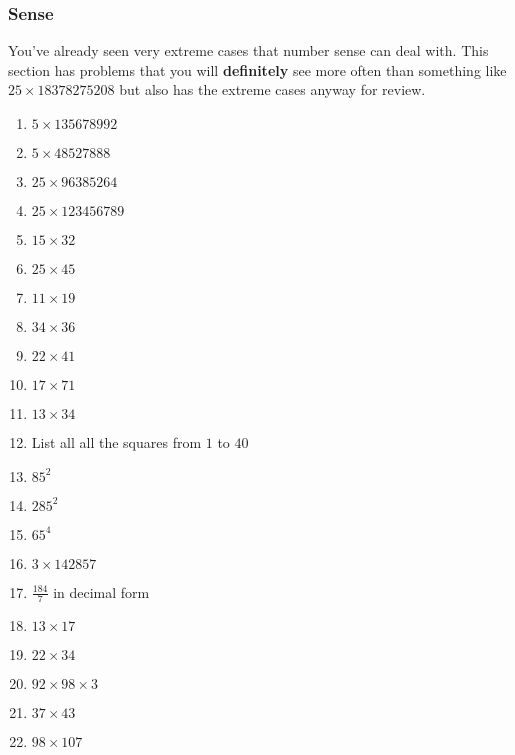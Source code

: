 		\subsubsection{Sense}
			You've already seen very extreme cases that number sense can deal with. This section has problems that you will \textbf{definitely} see more often than something like $25 \times 18378275208$ but also has the extreme cases anyway for review.
			\begin{enumerate}
				\item $5 \times 135678992$
				\item $5 \times 48527888$
				\item $25 \times 96385264$
				\item $25 \times 123456789$
				\item $15 \times 32$
				\item $25 \times 45$
				\item $11 \times 19$
				\item $34 \times 36$
				\item $22 \times 41$
				\item $17 \times 71$
				\item $13 \times 34$
				\item List all all the squares from $1$ to $40$
				\item $85^2$
				\item $285^2$
				\item $65^4$
				\item $3 \times 142857$
				\item $\frac{184}{7}$ in decimal form
				\item $13 \times 17$
				\item $22 \times 34$
				\item $92 \times 98 \times 3$
				\item $37 \times 43$
				\item $98 \times 107$
			\end{enumerate}
